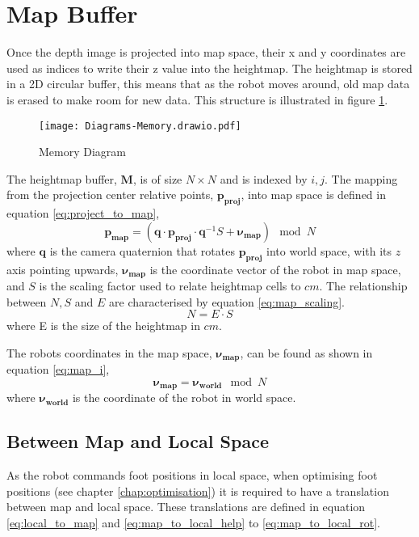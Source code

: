 \newpage
\section{Map Buffer}
    Once the depth image is projected into map space, their x and y coordinates are used as indices to write their z value into the heightmap. The heightmap is stored in
    a 2D circular buffer, this means that as the robot moves around, old map data is erased to make room for new data. This structure is illustrated in figure \ref{fig:memory}.
    \begin{figure}[h]
        \centering
        \texttt{[image: Diagrams-Memory.drawio.pdf]}
        \caption{Memory Diagram}
        \label{fig:memory}
    \end{figure}

    The heightmap buffer, \(\boldsymbol{M}\), is of size \(N \times N\) and is indexed by \(i,j\). The mapping from the projection center relative points, \(\boldsymbol{p_{proj}}\), into map space
    is defined in equation \ref{eq:project_to_map},
    \begin{equation} \label{eq:project_to_map}
        \boldsymbol{p_{map}} = (\boldsymbol{q} \cdot \boldsymbol{p_{proj}} \cdot \boldsymbol{q}^{-1}S + \boldsymbol{\nu_{map}}) \mod N
    \end{equation}
    where \(\boldsymbol{q}\) is the camera quaternion that rotates \(\boldsymbol{p_{proj}}\) into world space, with its \(z\) axis pointing upwards, \(\boldsymbol{\nu_{map}}\) 
    is the coordinate vector of the robot in map space, and \(S\) is the scaling factor
    used to relate heightmap cells to \(cm\). The relationship between \(N, S\) and \(E\) are characterised by equation \ref{eq:map_scaling}.
    \begin{equation} \label{eq:map_scaling}
        N = E \cdot S
    \end{equation}
    where E is the size of the heightmap in \(cm\).

    The robots coordinates in the map space, \(\boldsymbol{\nu_{map}}\), can be found as shown in equation \ref{eq:map_i},
    \begin{equation} \label{eq:map_i}
        \boldsymbol{\nu_{map}} = \boldsymbol{\nu_{world}} \mod N
    \end{equation}
    where \(\boldsymbol{\nu_{world}}\) is the coordinate of the robot in world space.

    \subsection{Between Map and Local Space}
        As the robot commands foot positions in local space, when optimising foot positions (see chapter \ref{chap:optimisation}) it is required to have a translation between map and local space.
        These translations are defined in equation \ref{eq:local_to_map} and \ref{eq:map_to_local_help} to \ref{eq:map_to_local_rot}.
        
